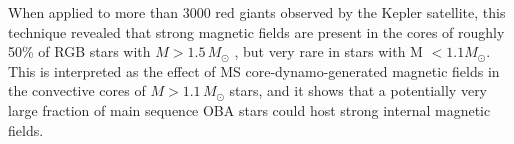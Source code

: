 When applied to more than 3000 red giants observed by the Kepler satellite, this technique revealed that strong magnetic fields are present in the cores of roughly 50\% of RGB stars with $M \! > \! 1.5 \, M_\odot$ \citep{Stello_2016,Stello_2016a}, but very rare in stars with M $< 1.1M_\odot$. This is interpreted as the effect of MS core-dynamo-generated magnetic fields in the convective cores of $M \! > \! 1.1 \, M_\odot$ stars, and it shows that a potentially very large fraction of main sequence OBA stars could host strong internal magnetic fields.



